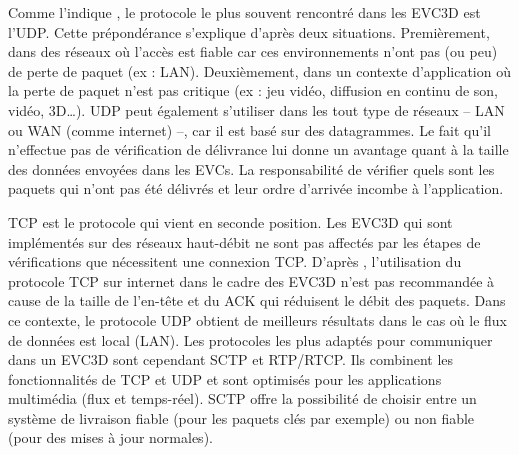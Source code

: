 Comme l'indique \cite{Roberto2014}, le protocole le plus souvent rencontré dans 
les \gls{EVC3D} est l'\gls{UDP}. 
Cette prépondérance s'explique d'après deux situations. Premièrement, dans des 
réseaux où l'accès est fiable car ces environnements n'ont 
pas (ou peu) de perte de paquet (ex : \gls{LAN}). Deuxièmement, dans un contexte 
d'application où la perte de paquet n'est pas critique (ex : jeu vidéo, diffusion en 
continu de son, vidéo, \gls{3D}\dots). 
\gls{UDP} peut également s'utiliser dans les tout type de réseaux -- \gls{LAN} ou 
\gls{WAN} (comme internet) --, car il est basé sur des datagrammes. Le fait qu'il 
n'effectue pas de vérification de délivrance lui donne un avantage quant 
à la taille des données envoyées dans les \glspl{EVC}. La responsabilité de 
vérifier quels sont les 
paquets qui n'ont pas été délivrés et leur ordre d'arrivée incombe à l'application.

\gls{TCP} est le protocole qui vient en seconde position. Les \gls{EVC3D} qui sont 
implémentés sur des réseaux haut-débit ne sont pas affectés par les étapes de 
vérifications que nécessitent une connexion \gls{TCP}. D'après \cite{Sung2006}, 
l'utilisation du protocole \gls{TCP} sur internet dans le cadre des \gls{EVC3D} n'est 
pas recommandée à cause de la taille de l'en-tête et du ACK qui réduisent le débit 
des paquets.
Dans ce contexte, le protocole \gls{UDP} obtient de meilleurs résultats dans le cas 
où le flux de données est local (\gls{LAN}). 
Les protocoles les plus adaptés pour communiquer dans un \gls{EVC3D} sont 
cependant \acrshort{SCTP} et \gls{RTP}/\gls{RTCP}. Ils combinent les 
fonctionnalités de 
\gls{TCP} et \gls{UDP} et sont optimisés pour les applications multimédia (flux et 
temps-réel). \gls{SCTP} offre la possibilité de choisir entre un système de 
livraison fiable (pour les paquets clés par exemple) ou non fiable (pour des mises 
à jour normales).

